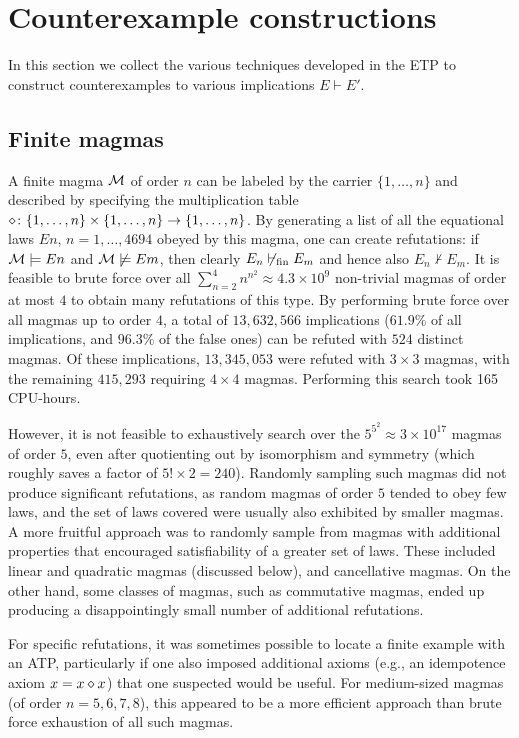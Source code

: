 
\section{Counterexample constructions}

In this section we collect the various techniques developed in the ETP to construct counterexamples to various implications $E \vdash E'$.

\subsection{Finite magmas}\label{finite-sec}

A finite magma ${\mathcal{M}}$ of order $n$ can be labeled by the carrier $\{1,\dots,n\}$ and described by specifying the multiplication table $\diamond \colon \{1,\dots,n\} \times \{1,\dots,n\} \to \{1,\dots,n\}$.  By generating a list of all the equational laws $En$, $n=1,\dots,4694$ obeyed by this magma, one can create refutations: if ${\mathcal{M}} \models En$ and ${\mathcal{M}} \not \models Em$, then clearly $E_n \not \vdash_{\mathrm{fin}} E_m$ and hence also $E_n \not \vdash E_m$.  It is feasible to brute force over all $\sum_{n=2}^4 n^{n^2} \approx 4.3 \times 10^9$ non-trivial magmas of order at most $4$ to obtain many refutations of this type.
By performing brute force over all magmas up to order $4$, a total of $13,632,566$ implications ($61.9\%$ of all implications, and $96.3\%$ of the false ones) can be refuted with $524$ distinct magmas. Of these implications, $13,345,053$ were refuted with $3 \times 3$ magmas, with the remaining $415,293$ requiring $4 \times 4$ magmas. Performing this search took 165 CPU-hours.

However, it is not feasible to exhaustively search over the $5^{5^2} \approx 3 \times 10^{17}$ magmas of order $5$, even after quotienting out by isomorphism and symmetry (which roughly saves a factor of $5! \times 2 = 240$).  Randomly sampling such magmas did not produce significant refutations, as random magmas of order $5$ tended to obey few laws, and the set of laws covered were usually also exhibited by smaller magmas.  A more fruitful approach was to randomly sample from magmas with additional properties that encouraged satisfiability of a greater set of laws.  These included linear and quadratic magmas (discussed below), and cancellative magmas.  On the other hand, some classes of magmas, such as commutative magmas, ended up producing a disappointingly small number of additional refutations.

For specific refutations, it was sometimes possible to locate a finite example with an ATP, particularly if one also imposed additional axioms (e.g., an idempotence axiom $x = x \diamond x$) that one suspected would be useful.  For medium-sized magmas (of order $n=5,6,7,8$), this appeared to be a more efficient approach than brute force exhaustion of all such magmas.

